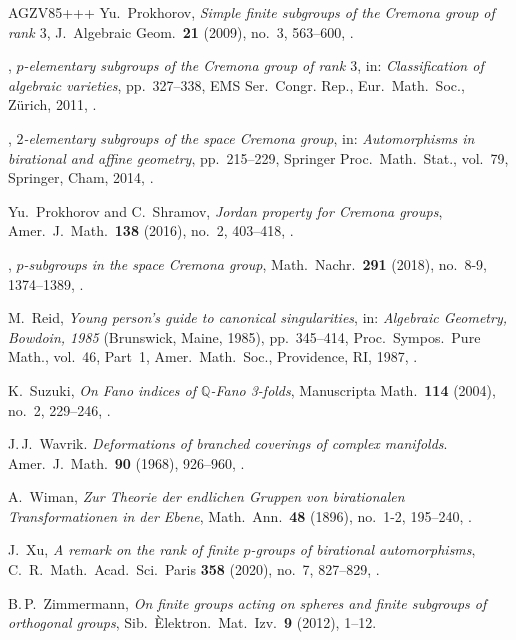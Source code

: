 \begin{thebibliography}{AGZV85+++}
Yu.~Prokhorov, 
 {\em Simple finite subgroups of the Cremona group of rank $3$}, 
 J.~Algebraic Geom.\ \textbf{21} (2009), no.~3, 563--600,
 .

\bysame, 
{\em {$p$}-elementary subgroups of the {C}remona group of rank $3$}, 
in: {\em Classification of algebraic varieties}, pp.~327--338,
EMS Ser.\ Congr. Rep., Eur.\ Math.\ Soc., Z\"urich, 2011,
.

\bysame, 
 {\em $2$-elementary subgroups of the space {C}remona group},
 in: {\em Automorphisms in birational and affine geometry}, pp.~215--229, 
 Springer Proc.\ Math.\ Stat., vol.~79, Springer, Cham, 2014,
 .

Yu.~Prokhorov and C.~Shramov, 
 {\em Jordan property for Cremona groups},
 Amer.\ J.~Math.\ \textbf{138} (2016), no.~2, 403--418,
 .

\bysame, 
 {\em $p$-subgroups in the space Cremona group},
 Math.\ Nachr.\ \textbf{291} (2018), no.~8-9, 1374--1389, 
 .

M.~Reid, 
{\em Young person's guide to canonical singularities},
in: \emph{Algebraic  Geometry, {B}owdoin, 1985} ({B}runswick, {M}aine, 1985), pp.~345--414, Proc.\ Sympos.\ Pure  Math., vol.~46, Part~1, Amer.\ Math.\ Soc., Providence, RI, 1987, .

K.~Suzuki, 
 {\em On Fano indices of $\mathbb Q$-Fano 3-folds},
 Manuscripta Math.\ \textbf{114} (2004), no.~2, 229--246,
 . 

J.\,J.~Wavrik.
 {\em Deformations of branched coverings of complex manifolds}.
 Amer.~J.\ Math.\ \textbf{90} (1968), 926--960,
 .

A.~Wiman, 
 {\em Zur Theorie der endlichen Gruppen von birationalen Transformationen in der Ebene}, 
 Math.\ Ann.\ \textbf{48} (1896), no.~1-2, 195--240,
 .

J.~Xu, 
 {\em A remark on the rank of finite $p$-groups of birational
automorphisms}, 
 C.\ R.\ Math.\ Acad.\ Sci.\ Paris \textbf{358} (2020), no.~7, 827--829,
 . 

B.\,P.~Zimmermann, 
 {\em On finite groups acting on spheres and finite subgroups of orthogonal groups}, 
 Sib.\ \`Elektron.\ Mat.\ Izv.\ \textbf{9} (2012), 1--12.

\end{thebibliography}
